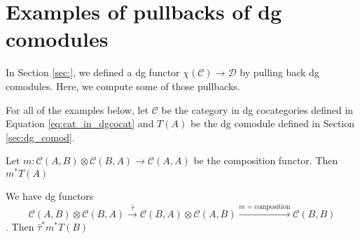 \section{Examples of pullbacks of dg comodules}
In Section \ref{sec:}, we defined a dg functor
$\chi(\mathcal{C}) \to \mathcal{D}$ 
by pulling back dg comodules. Here, we compute 
some of those pullbacks.

For all of the examples below, let $\mathcal{C}$ 
be the category in dg cocategories defined in 
Equation \ref{eq:cat_in_dgcocat} and $T(A)$ be the 
dg comodule defined in Section \ref{sec:dg_comod}.

\begin{eg} Let $m:\mathcal{C}(A,B) \otimes 
\mathcal{C}(B,A) \to \mathcal{C}(A,A)$ be the composition 
functor. Then $m^*T(A)$
\end{eg}

\begin{eg} We have dg functors
$$\mathcal{C}(A,B) \otimes 
\mathcal{C}(B,A) 
\xrightarrow{\hat{\tau}}
\mathcal{C}(B,A) \otimes 
\mathcal{C}(A,B) 
\xrightarrow{m=\textrm{composition}}
 \mathcal{C}(B,B)$$. Then $\hat{\tau}^*m^*T(B)$
\end{eg}